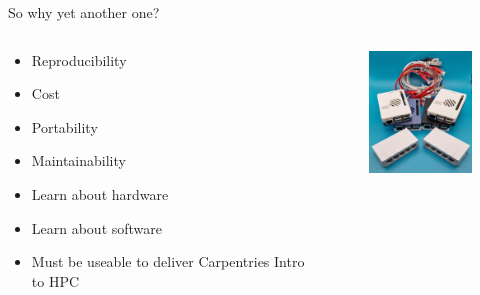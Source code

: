 \begin{frame}{So why yet another one?}
	\begin{columns}
		\begin{column}{0.5\linewidth}
			\begin{itemize}[label={$\color{UmUBlue}\bullet$}]
				\item Reproducibility
				\item Cost
				\item Portability
				\item Maintainability
				\item Learn about hardware
				\item Learn about software
				\item Must be useable to deliver Carpentries Intro to HPC
			\end{itemize}
		\end{column}
		\begin{column}{0.5\linewidth}
			\begin{figure}
				\includegraphics[width=3.5cm]{graphics/trainingkit.jpg}
			\end{figure}
		\end{column}
	\end{columns}
\end{frame}
